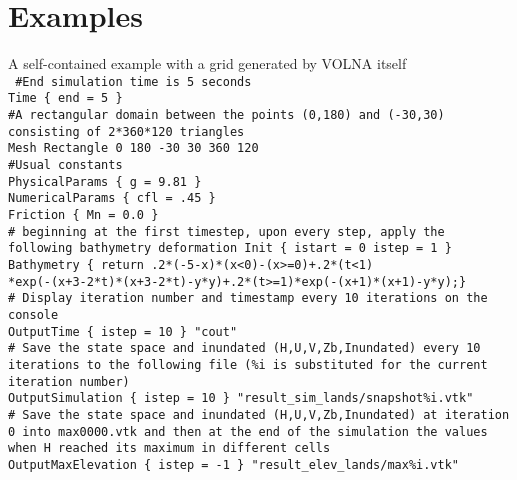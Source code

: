 \documentclass[11pt]{article}
\begin{document}
\section{Examples}
A self-contained example with a grid generated by VOLNA itself \\
{\tt
\#End simulation time is 5 seconds \\
Time \{ end = 5 \} \\
\#A rectangular domain between the points (0,180) and (-30,30) consisting of 2*360*120 triangles \\
Mesh Rectangle 0 180 -30 30 360 120 \\
\#Usual constants \\
PhysicalParams \{ g = 9.81 \} \\
NumericalParams \{ cfl = .45 \} \\
Friction \{ Mn = 0.0 \} \\
\# beginning at the first timestep, upon every step, apply the following bathymetry deformation
Init \{ istart = 0 istep = 1 \} Bathymetry \{ return .2*(-5-x)*(x<0)-(x>=0)+.2*(t<1) \\ *exp(-(x+3-2*t)*(x+3-2*t)-y*y)+.2*(t>=1)*exp(-(x+1)*(x+1)-y*y);\} \\
\# Display iteration number and timestamp every 10 iterations on the console \\
OutputTime \{ istep = 10 \} "cout" \\
\# Save the state space and inundated (H,U,V,Zb,Inundated) every 10 iterations to the following file (\%i is substituted for the current iteration number) \\
OutputSimulation \{ istep = 10 \} "result\_sim\_lands/snapshot\%i.vtk" \\
\# Save the state space and inundated (H,U,V,Zb,Inundated) at iteration 0 into max0000.vtk and then at the end of the simulation the values when H reached its maximum in different cells \\
OutputMaxElevation \{ istep = -1 \} "result\_elev\_lands/max\%i.vtk" \\
}
\\
\end{document}
